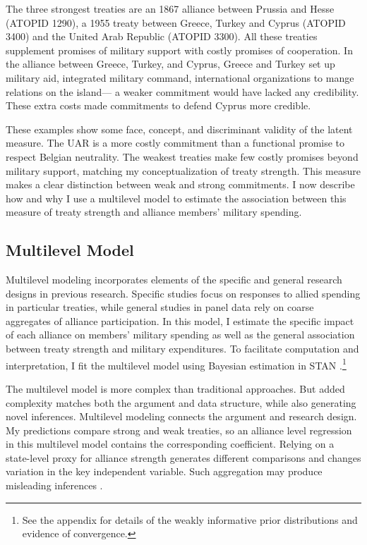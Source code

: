 \documentclass[12pt]{article}
\begin{document}
The three strongest treaties are an 1867 alliance between Prussia and Hesse (ATOPID 1290), a 1955 treaty between Greece, Turkey and Cyprus (ATOPID 3400) and the United Arab Republic (ATOPID 3300).  
All these treaties supplement promises of military support with costly promises of cooperation. 
In the alliance between Greece, Turkey, and Cyprus, Greece and Turkey set up military aid, integrated military command, international organizations to mange relations on the island--- a weaker commitment would have lacked any credibility. 
These extra costs made commitments to defend Cyprus more credible. 


These examples show some face, concept, and discriminant validity of the latent measure. 
The UAR is a more costly commitment than a functional promise to respect Belgian neutrality. 
The weakest treaties make few costly promises beyond military support, matching my conceptualization of treaty strength. 
This measure makes a clear distinction between weak and strong commitments. 
I now describe how and why I use a multilevel model to estimate the association between this measure of treaty strength and alliance members' military spending.  


\subsection{Multilevel Model} 


Multilevel modeling incorporates elements of the specific and general research designs in previous research. 
Specific studies focus on responses to allied spending in particular treaties, while general studies in panel data rely on coarse aggregates of alliance participation.
In this model, I estimate the specific impact of each alliance on members' military spending as well as the general association between treaty strength and military expenditures. 
To facilitate computation and interpretation, I fit the multilevel model using Bayesian estimation in STAN \citep{Carpenteretal2016}.\footnote{See the appendix for details of the weakly informative prior distributions and evidence of convergence.}


The multilevel model is more complex than traditional approaches. 
But added complexity matches both the argument and data structure, while also generating novel inferences. 
Multilevel modeling connects the argument and research design. 
My predictions compare strong and weak treaties, so an alliance level regression in this multilevel model contains the corresponding coefficient.
Relying on a state-level proxy for alliance strength generates different comparisons and changes variation in the key independent variable.
Such aggregation may produce misleading inferences \citep{McElreath2016}. 
\end{document}
